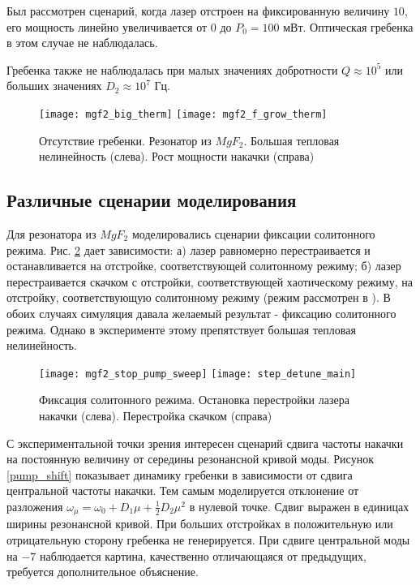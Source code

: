 Был рассмотрен сценарий, когда лазер отстроен на фиксированную величину $10$, его мощность линейно увеличивается от 0 до $P_0=100$ мВт. Оптическая гребенка в этом случае не наблюдалась.

Гребенка также не наблюдалась при малых значениях добротности $Q\approx10^5$ или больших значениях $D_2\approx10^7$ Гц.

\begin{figure}
  \texttt{[image: mgf2\_big\_therm]}
  \texttt{[image: mgf2\_f\_grow\_therm]}
  \caption{Отсутствие гребенки. Резонатор из $MgF_2$. Большая тепловая нелинейность (слева). Рост мощности накачки (справа)} \label{no_comb}
\end{figure}

\subsection{Различные сценарии моделирования}

Для резонатора из $MgF_2$ моделировались сценарии фиксации солитонного режима. Рис. \ref{step_detune} дает зависимости: а) лазер равномерно перестраивается и останавливается на отстройке, соответствующей солитонному режиму; б) лазер перестраивается скачком с отстройки, соответствующей хаотическому режиму, на отстройку, соответствующую солитонному режиму (режим рассмотрен в \cite{matsko_optics_letters}). В обоих случаях симуляция давала желаемый результат - фиксацию солитонного режима. Однако в эксперименте этому препятствует большая тепловая нелинейность.

\begin{figure}
  \texttt{[image: mgf2\_stop\_pump\_sweep]}
  \texttt{[image: step\_detune\_main]}
  \caption{Фиксация солитонного режима. Остановка перестройки лазера накачки (слева). Перестройка скачком (справа)} \label{step_detune}
\end{figure}

С экспериментальной точки зрения интересен сценарий сдвига частоты накачки на постоянную величину от середины резонансной кривой моды. Рисунок \ref{pump_shift} показывает динамику гребенки в зависимости от сдвига центральной частоты накачки. Тем самым моделируется отклонение от разложения $\omega_\mu=\omega_0+D_1\mu+\frac{1}{2}D_2\mu^2$ в нулевой точке. Сдвиг выражен в единицах ширины резонансной кривой. При больших отстройках в положительную или отрицательную сторону гребенка не генерируется. При сдвиге центральной моды на $-7$ наблюдается картина, качественно отличающаяся от предыдущих, требуется дополнительное объяснение.

